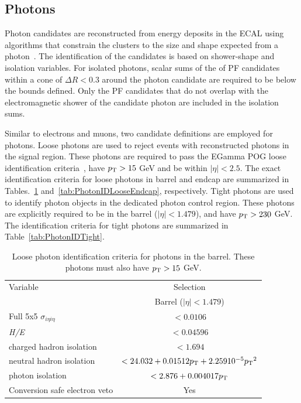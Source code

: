 \subsection{Photons}
\label{subsec:photons}

Photon candidates are reconstructed from energy deposits in the ECAL using algorithms
that constrain the clusters to the size and shape expected from a photon~\cite{CMS:EGM-14-001}.
The identification of the candidates is based on shower-shape and isolation variables.
For isolated photons, scalar sums of the \pt of PF candidates within a cone of $\Delta R < 0.3$
around the photon candidate are required to be below the bounds defined. Only the PF candidates
that do not overlap with the electromagnetic shower of the candidate photon are included in the isolation sums.

Similar to electrons and muons, two candidate definitions are employed for photons. Loose photons are used to reject
events with reconstructed photons in the signal region. These photons are required to pass the EGamma POG loose identification criteria~\cite{CMS-EGM-TWIKI-GAMID},
have $p_{\textrm{T}} > 15$ GeV and be within $|\eta|<2.5$. The exact identification criteria for loose photons in barrel and endcap 
are summarized in Tables.~\ref{tab:PhotonIDLooseBarrel} and~\ref{tab:PhotonIDLooseEndcap}, respectively.
Tight photons are used to identify photon objects in the dedicated photon control region. 
These photons are explicitly required to be in the barrel ($|\eta|<1.479$), and have $p_{\textrm{T}}>230$ GeV. The identification criteria for tight photons
are summarized in Table~\ref{tab:PhotonIDTight}.

\begin{table}[htb!]
    \centering
    \small
    \def\arraystretch{1.2}
    \begin{tabular}{l c}
    \hline
    Variable                                   &  Selection       \\
                                               &  Barrel ($|\eta|<1.479$) \\
    \hline
    \hline
    Full 5x5 $\sigma_{i\eta i\eta}$            & $< 0.0106 $    \\
    \textit{H/E}                               & $<  0.04596 $    \\
    charged hadron isolation                   & $< 1.694 $     \\
    neutral hadron isolation                   & $< 24.032 + 0.01512 p_{\textrm{T}}+2.259 10^{-5} {p_{\textrm{T}}}^2$ \\
    photon isolation                           & $< 2.876 + 0.004017 p_{\textrm{T}}$  \\
    Conversion safe electron veto              & Yes           \\
    \hline
    \end{tabular}
    \caption{Loose photon identification criteria for photons in the barrel. These photons must also have $p_{\textrm{T}} > 15$ GeV.}
    \label{tab:PhotonIDLooseBarrel}
\end{table}

